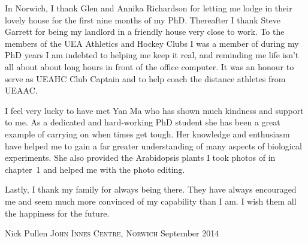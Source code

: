In Norwich, I thank Glen and Annika Richardson for letting me lodge in their lovely house for the first nine months of my PhD.
Thereafter I thank Steve Garrett for being my landlord in a friendly house very close to work.
To the members of the UEA Athletics and Hockey Clubs I was a member of during my PhD years I am indebted to helping me keep it real, and reminding me life isn't all about about long hours in front of the office computer.
It was an honour to serve as UEAHC Club Captain and to help coach the distance athletes from UEAAC\@.

I feel very lucky to have met Yan Ma who has shown much kindness and support to me.
As a dedicated and hard-working PhD student she has been a great example of carrying on when times get tough.
Her knowledge and enthusiasm have helped me to gain a far greater understanding of many aspects of biological experiments.
She also provided the Arabidopsis plants I took photos of in chapter~1 and helped me with the photo editing.

Lastly, I thank my family for always being there.
They have always encouraged me and seem much more convinced of my capability than I am.
I wish them all the happiness for the future.

\vspace{1cm}
\noindent Nick Pullen\newline
{\scshape John Innes Centre, Norwich}\newline
September {\scshape 2014}
